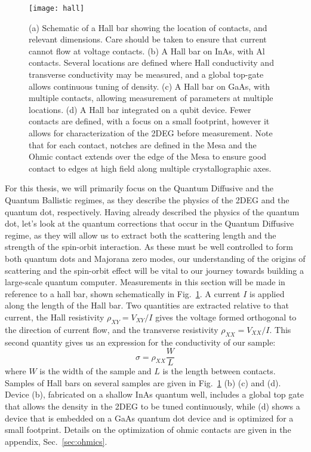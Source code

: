 \begin{figure}
  \texttt{[image: hall]}
  \caption[Schematic of a Hall bar and several devices]
  {\label{fig:hall}(a) Schematic of a Hall bar showing the location of contacts, and relevant dimensions. Care should be taken to ensure that current cannot flow at voltage contacts. (b) A Hall bar on InAs, with Al contacts. Several locations are defined where Hall conductivity and transverse conductivity may be measured, and a global top-gate allows continuous tuning of density. (c) A Hall bar on GaAs, with multiple contacts, allowing measurement of parameters at multiple locations. (d) A Hall bar integrated on a qubit device. Fewer contacts are defined, with a focus on a small footprint, however it allows for characterization of the 2DEG before measurement. Note that for each contact, notches are defined in the Mesa and the Ohmic contact extends over the edge of the Mesa to ensure good contact to edges at high field along multiple crystallographic axes.}
\end{figure}

For this thesis, we will primarily focus on the Quantum Diffusive and the Quantum Ballistic regimes, as they describe the physics of the
2DEG and the quantum dot, respectively. Having already described the physics of the quantum dot, let's look at the quantum corrections that occur
in the Quantum Diffusive regime, as they will allow us to extract both the scattering length and the strength of the spin-orbit interaction. As these must be well controlled to form both quantum dots and Majorana zero modes, our understanding of the origins of
scattering and the spin-orbit effect will be vital to our journey towards building a large-scale quantum computer. Measurements in this section
will be made in reference to a hall bar, shown schematically in Fig.~\ref{fig:hall}. A current $I$ is applied along the length of the Hall bar.
Two quantities are extracted relative to that current, the Hall resistivity $\rho_{XY} = V_{XY}/I$ gives
the voltage formed orthogonal to the direction of current flow, and the transverse resistivity $\rho_{XX} = V_{XX}/I$.
This second quantity gives us an expression for the conductivity of our sample:
\begin{equation}
  \sigma = \rho_{XX} \frac{W}{L}
\end{equation}
where $W$ is the width of the sample and $L$ is the length between contacts. Samples of Hall bars on several samples are given in Fig.~\ref{fig:hall} (b)
(c) and (d). Device (b), fabricated on a shallow InAs quantum well, includes a global top gate that allows the density in the 2DEG to be tuned continuously,
while (d) shows a device that is embedded on a GaAs quantum dot device and is optimized for a small footprint. Details on the optimization of ohmic contacts
are given in the appendix, Sec.~\ref{sec:ohmics}.

